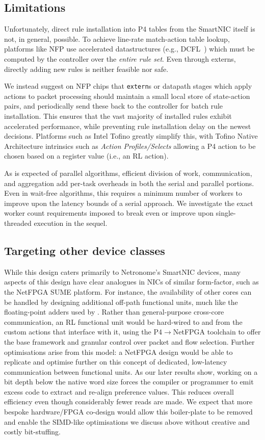 \documentclass[
sigconf,natbib=false
]{acmart}
\begin{document}
\subsection{Limitations}\label{sec:limitations}
Unfortunately, direct rule installation into P4 tables from the SmartNIC itself is not, in general, possible.
To achieve line-rate match-action table lookup, platforms like NFP use accelerated datastructures (e.g., DCFL~\parencite{DBLP:conf/infocom/TaylorT05}) which must be computed by the controller over the \emph{entire rule set}.
Even through externs, directly adding new rules is neither feasible nor safe.

We instead suggest on NFP chips that \texttt{extern}s or datapath stages which apply actions to packet processing should maintain a small local store of state-action pairs, and periodically send these back to the controller for batch rule installation.
This ensures that the vast majority of installed rules exhibit accelerated performance, while preventing rule installation delay on the newest decisions.
Platforms such as Intel Tofino greatly simplify this, with Tofino Native Architecture intrinsics such as \emph{Action Profiles/Selects} allowing a P4 action to be chosen based on a register value (i.e., an RL action).

As is expected of parallel algorithms, efficient division of work, communication, and aggregation add per-task overheads in both the serial and parallel portions.
Even in wait-free algorithms, this requires a minimum number of workers to improve upon the latency bounds of a serial approach.
We investigate the exact worker count requirements imposed to break even or improve upon single-threaded execution in the sequel.

\subsection{Targeting other device classes}
While this design caters primarily to Netronome's SmartNIC devices, many aspects of this design have clear analogues in NICs of similar form-factor, such as the NetFPGA SUME platform.
For instance, the availability of other cores can be handled by designing additional off-path functional units, much like the floating-point adders used by \textcite{DBLP:conf/isca/LiLYCSH19}.
Rather than general-purpose cross-core communication, an RL functional unit would be hard-wired to and from the custom actions that interface with it, using the P4$\rightarrow$NetFPGA toolchain to offer the base framework and granular control over packet and flow selection.
Further optimisations arise from this model: a NetFPGA design would be able to replicate and optimise further on this concept of dedicated, low-latency communication between functional units.
As our later results show, working on a bit depth below the native word size forces the compiler or programmer to emit excess code to extract and re-align preference values.
This reduces overall efficiency even though considerably fewer reads are made.
We expect that more bespoke hardware/FPGA co-design would allow this boiler-plate to be removed and enable the SIMD-like optimisations we discuss above without creative and costly bit-stuffing.
\end{document}
